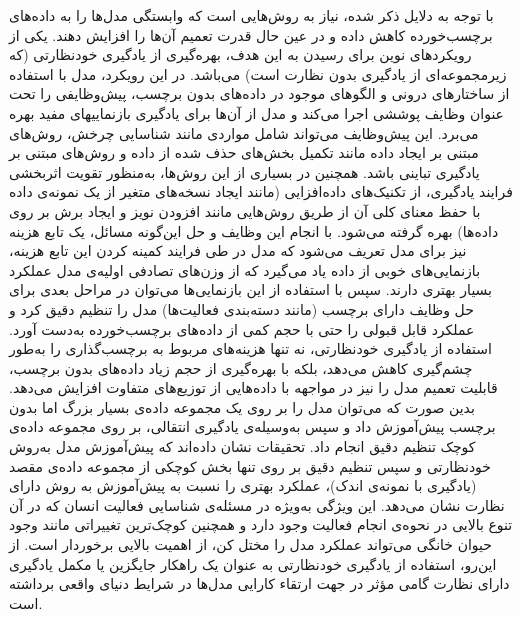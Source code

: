با توجه به دلایل ذکر شده، نیاز به روش‌هایی است که وابستگی مدل‌ها را به داده‌های برچسب‌خورده کاهش داده و در عین حال قدرت تعمیم آن‌ها را افزایش دهند. یکی از رویکردهای نوین برای رسیدن به این هدف، بهره‌گیری از یادگیری خودنظارتی
(که زیرمجموعه‌ای از یادگیری بدون نظارت است)
می‌باشد. در این رویکرد، مدل با استفاده از ساختارهای درونی و الگوهای موجود در داده‌های بدون برچسب، پیش‌وظایفی را تحت عنوان
وظایف پوششی
اجرا می‌کند و مدل از آن‌ها برای یادگیری
بازنماییهای
مفید بهره می‌برد. این پیش‌وظایف می‌تواند شامل مواردی مانند شناسایی چرخش\cite{gidaris2018unsupervised}،
روش‌های مبتنی بر ایجاد داده مانند تکمیل بخش‌های حذف شده از داده\cite{he2022masked}
و روش‌های مبتنی بر یادگیری تباینی\cite{chen2020simple,grill2020bootstrap,caron2020unsupervised}
باشد. همچنین در بسیاری از این روش‌ها، به‌منظور تقویت اثربخشی فرایند یادگیری، از تکنیک‌های
داده‌افزایی
(مانند ایجاد نسخه‌های متغیر از یک نمونه‌ی داده با حفظ معنای کلی آن از طریق روش‌هایی مانند افزودن نویز و ایجاد برش بر روی داده‌ها) بهره گرفته می‌شود. با انجام این وظایف و حل این‌گونه مسائل، یک تابع هزینه نیز برای مدل تعریف می‌شود که مدل در طی فرایند کمینه کردن این تابع هزینه، بازنمایی‌های خوبی از داده یاد می‌گیرد که از وزن‌های تصادفی اولیه‌ی مدل عملکرد بسیار بهتری دارند.
سپس با استفاده از این بازنمایی‌ها می‌توان در مراحل بعدی برای حل وظایف دارای برچسب (مانند دسته‌بندی فعالیت‌ها) مدل را
تنظیم دقیق
کرد و عملکرد قابل قبولی را حتی با حجم کمی از داده‌های برچسب‌خورده به‌دست آورد\cite{gidaris2018unsupervised}.
استفاده از یادگیری خودنظارتی، نه تنها هزینه‌های مربوط به برچسب‌گذاری را به‌طور چشم‌گیری کاهش می‌دهد، بلکه با بهره‌گیری از حجم زیاد داده‌های بدون برچسب، قابلیت تعمیم مدل را نیز در مواجهه با داده‌هایی از توزیع‌های متفاوت افزایش می‌دهد. بدین صورت که می‌توان مدل را بر روی یک مجموعه داده‌ی بسیار بزرگ اما بدون برچسب پیش‌آموزش داد و سپس به‌وسیله‌ی
یادگیری انتقالی،
بر روی مجموعه داده‌ی کوچک تنظیم دقیق انجام داد. تحقیقات نشان داده‌اند که پیش‌آموزش مدل به‌روش خودنظارتی و سپس تنظیم دقیق بر روی تنها بخش کوچکی از مجموعه داده‌ی مقصد
(یادگیری با نمونه‌ی اندک)،
عملکرد بهتری را نسبت به پیش‌آموزش به روش دارای نظارت نشان می‌دهد\cite{chen2020big,yuan2024self}.
این ویژگی به‌ویژه در مسئله‌ی شناسایی فعالیت انسان که در آن تنوع بالایی در نحوه‌ی انجام فعالیت وجود دارد و همچنین کوچک‌ترین تغییراتی مانند وجود حیوان خانگی می‌تواند عملکرد مدل را مختل کن، از اهمیت بالایی برخوردار است. از این‌رو، استفاده از یادگیری خودنظارتی به عنوان یک راهکار جایگزین یا مکمل یادگیری دارای نظارت گامی مؤثر در جهت ارتقاء کارایی مدل‌ها در شرایط دنیای واقعی برداشته است.

